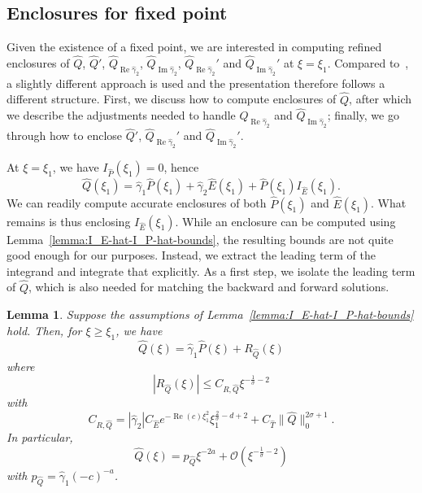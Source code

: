 \documentclass[11pt]{article}
\DeclareMathOperator{\real}{Re}
\DeclareMathOperator{\imag}{Im}
\newtheorem{lemma}[definition]{Lemma}
\begin{document}
\subsection{Enclosures for fixed point}
\label{sec:fixed-point-enclosures-hat}

Given the existence of a fixed point, we are interested in computing
refined enclosures of \(\hat{Q}\), \(\hat{Q}'\),
\(\hat{Q}_{\real\hat{\gamma}_{2}}\),
\(\hat{Q}_{\imag\hat{\gamma}_{2}}\),
\(\hat{Q}_{\real\hat{\gamma}_{2}}'\) and
\(\hat{Q}_{\imag\hat{\gamma}_{2}}'\) at \(\xi = \xi_{1}\). Compared
to~\cite{Dahne2024}, a slightly different approach is used and the
presentation therefore follows a different structure. First, we
discuss how to compute enclosures of \(\hat{Q}\), after which we
describe the adjustments needed to handle
\(\hat{Q}_{\real\hat{\gamma}_{2}}\) and
\(\hat{Q}_{\imag\hat{\gamma}_{2}}\); finally, we go through how to
enclose \(\hat{Q}'\), \(\hat{Q}_{\real\hat{\gamma}_{2}}'\) and
\(\hat{Q}_{\imag\hat{\gamma}_{2}}'\).

At \(\xi = \xi_{1}\), we have \(I_{\hat{P}}(\xi_{1}) = 0\), hence
\begin{equation*}
  \hat{Q}(\xi_{1})
  = \hat{\gamma}_{1}\hat{P}(\xi_{1}) + \hat{\gamma}_{2}\hat{E}(\xi_{1})
  + \hat{P}(\xi_{1})I_{\hat{E}}(\xi_{1}).
\end{equation*}
We can readily compute accurate enclosures of both
\(\hat{P}(\xi_{1})\) and \(\hat{E}(\xi_{1})\). What remains is thus
enclosing \(I_{\hat{E}}(\xi_{1})\). While an enclosure can be computed
using Lemma~\ref{lemma:I_E-hat-I_P-hat-bounds}, the resulting bounds
are not quite good enough for our purposes. Instead, we extract the
leading term of the integrand and integrate that explicitly. As a
first step, we isolate the leading term of \(\hat{Q}\), which is also
needed for matching the backward and forward solutions.

\begin{lemma}\label{lemma:Q-hat-leading-term}
  Suppose the assumptions of Lemma~\ref{lemma:I_E-hat-I_P-hat-bounds}
  hold. Then, for \(\xi \geq \xi_{1}\), we have
  \begin{equation*}
    \hat{Q}(\xi) = \hat{\gamma}_{1}\hat{P}(\xi) + R_{\hat{Q}}(\xi)
  \end{equation*}
  where
  \begin{equation*}
    |R_{\hat{Q}}(\xi)| \leq C_{R,\hat{Q}}\xi^{-\frac{1}{\sigma} - 2}
  \end{equation*}
  with
  \begin{equation*}
    C_{R,\hat{Q}} = |\hat{\gamma}_{2}|C_{\hat{E}}e^{-\real(c)\xi_{1}^{2}}\xi_{1}^{\frac{2}{\sigma} - d + 2}
    + C_{\hat{T}}\|\hat{Q}\|_{0}^{2\sigma + 1}.
  \end{equation*}
  In particular,
  \begin{equation*}
    \hat{Q}(\xi) = p_{\hat{Q}}\xi^{-2a} + \mathcal{O}(\xi^{-\frac{1}{\sigma} - 2})
  \end{equation*}
  with \(p_{\hat{Q}} = \hat{\gamma}_{1}(-c)^{-a}\).
\end{lemma}
\end{document}
